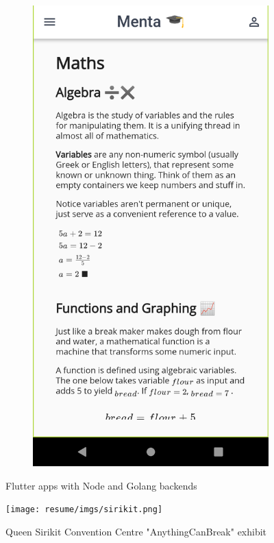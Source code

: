 \begin{figure}[h!]
\begin{subfigure}[b]{0.21\linewidth}
    \includegraphics[width=\linewidth]{resume/imgs/menta/mob3.png}
  \end{subfigure}
  \caption{Flutter apps with Node and Golang backends}
  \label{fig:coffee}
\end{figure}

\begin{figure}[h!]
	\centering
	\texttt{[image: resume/imgs/sirikit.png]}
	\caption{Queen Sirikit Convention Centre "AnythingCanBreak" exhibit}
\end{figure}
